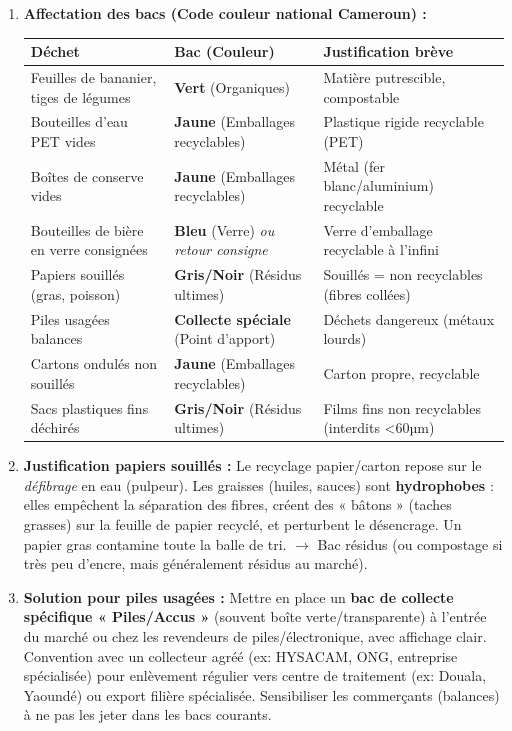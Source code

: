 \documentclass[11pt]{article}
\begin{document}
\begin{corrige}
\begin{enumerate}
    \item \textbf{Affectation des bacs (Code couleur national Cameroun) :}
    \begin{center}
        \begin{tabular}{|l|l|l|}
            \hline
            \textbf{Déchet} & \textbf{Bac (Couleur)} & \textbf{Justification brève} \\ \hline
            Feuilles de bananier, tiges de légumes & \textbf{Vert} (Organiques) & Matière putrescible, compostable \\ \hline
            Bouteilles d'eau PET vides & \textbf{Jaune} (Emballages recyclables) & Plastique rigide recyclable (PET) \\ \hline
            Boîtes de conserve vides & \textbf{Jaune} (Emballages recyclables) & Métal (fer blanc/aluminium) recyclable \\ \hline
            Bouteilles de bière en verre consignées & \textbf{Bleu} (Verre) \textit{ou retour consigne} & Verre d'emballage recyclable à l'infini \\ \hline
            Papiers souillés (gras, poisson) & \textbf{Gris/Noir} (Résidus ultimes) & Souillés = non recyclables (fibres collées) \\ \hline
            Piles usagées balances & \textbf{Collecte spéciale} (Point d'apport) & Déchets dangereux (métaux lourds) \\ \hline
            Cartons ondulés non souillés & \textbf{Jaune} (Emballages recyclables) & Carton propre, recyclable \\ \hline
            Sacs plastiques fins déchirés & \textbf{Gris/Noir} (Résidus ultimes) & Films fins non recyclables (interdits <60µm) \\ \hline
        \end{tabular}
    \end{center}

    \item \textbf{Justification papiers souillés :} Le recyclage papier/carton repose sur le \emph{défibrage} en eau (pulpeur). Les graisses (huiles, sauces) sont \textbf{hydrophobes} : elles empêchent la séparation des fibres, créent des « bâtons » (taches grasses) sur la feuille de papier recyclé, et perturbent le désencrage. Un papier gras contamine toute la balle de tri. $\rightarrow$ Bac résidus (ou compostage si très peu d'encre, mais généralement résidus au marché).

    \item \textbf{Solution pour piles usagées :} Mettre en place un \textbf{bac de collecte spécifique « Piles/Accus »} (souvent boîte verte/transparente) à l'entrée du marché ou chez les revendeurs de piles/électronique, avec affichage clair. Convention avec un collecteur agréé (ex: HYSACAM, ONG, entreprise spécialisée) pour enlèvement régulier vers centre de traitement (ex: Douala, Yaoundé) ou export filière spécialisée. Sensibiliser les commerçants (balances) à ne pas les jeter dans les bacs courants.
\end{enumerate}
\end{corrige}
\end{document}
